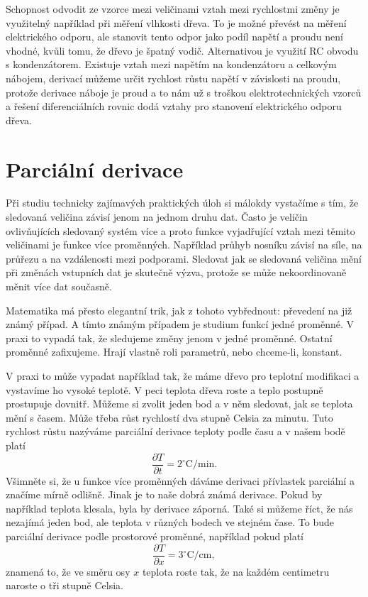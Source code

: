 \documentclass[12pt]{article}
\begin{document}
Schopnost odvodit ze vzorce mezi veličinami vztah mezi rychlostmi změny je využitelný například při měření vlhkosti dřeva. To je možné převést na měření elektrického odporu, ale stanovit tento odpor jako podíl napětí a proudu není vhodné, kvůli tomu, že dřevo je špatný vodič. Alternativou je využití RC obvodu s kondenzátorem. Existuje vztah mezi napětím na kondenzátoru a celkovým nábojem, derivací můžeme určit rychlost růstu napětí v závislosti na proudu, protože derivace náboje je proud a to nám už s troškou elektrotechnických vzorců a řešení diferenciálních rovnic dodá vztahy pro stanovení elektrického odporu dřeva.

\newpage
\section*{Parciální derivace}

Při studiu technicky zajímavých praktických úloh si málokdy vystačíme s tím, že sledovaná veličina závisí jenom na jednom druhu dat. Často je veličin ovlivňujících sledovaný systém více a proto funkce vyjadřující vztah mezi těmito veličinami je funkce více proměnných. Například průhyb nosníku závisí na síle, na průřezu a na vzdálenosti mezi podporami. Sledovat jak se sledovaná veličina mění při změnách vstupních dat je skutečně výzva, protože se může nekoordinovaně měnit více dat současně.

Matematika má přesto elegantní trik, jak z tohoto vybřednout: převedení na již známý případ. A tímto známým případem je studium funkcí jedné proměnné. V praxi to vypadá tak, že sledujeme změny jenom v jedné proměnné. Ostatní proměnné zafixujeme. Hrají vlastně roli parametrů, nebo chceme-li, konstant.

V praxi to může vypadat například tak, že máme dřevo pro teplotní modifikaci a vystavíme ho vysoké teplotě. V peci teplota dřeva roste a teplo postupně prostupuje dovnitř. Můžeme si zvolit jeden bod a v něm sledovat, jak se teplota mění s časem. Může třeba růst rychlostí dva stupně Celsia za minutu. Tuto rychlost růstu nazýváme parciální derivace teploty podle času a v našem bodě platí $$\frac{\partial T}{\partial t}=2^{\circ}\mathrm C/\mathrm{min}.$$ Všimněte si, že u funkce více proměnných dáváme derivaci přívlastek parciální a značíme mírně odlišně. Jinak je to naše dobrá známá derivace. Pokud by například teplota klesala, byla by derivace záporná. Také si můžeme říct, že nás nezajímá jeden bod, ale teplota v různých bodech ve stejném čase. To bude parciální derivace podle prostorové proměnné, například pokud platí $$\frac{\partial T}{\partial x}=3^{\circ}\mathrm C/\mathrm{cm},$$ znamená to, že ve směru osy $x$ teplota roste tak, že na každém centimetru naroste o tři stupně Celsia.
\end{document}
